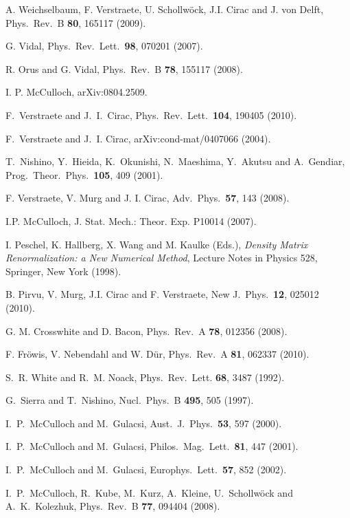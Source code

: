 A. Weichselbaum, F. Verstraete, U. Schollw\"{o}ck, J.I. Cirac and J. von Delft, Phys.\ Rev.\ B {\bf 80}, 165117 (2009).

G. Vidal, Phys.\ Rev.\ Lett.\ {\bf 98}, 070201 (2007).

R. Orus and G. Vidal, Phys.\ Rev.\ B {\bf 78}, 155117 (2008).

I. P. McCulloch, arXiv:0804.2509.

F.~Verstraete and J.~I.~Cirac, Phys.\ Rev.\ Lett.\ {\bf 104}, 190405 (2010).

F.~Verstraete and J.~I. Cirac, arXiv:cond-mat/0407066 (2004).

T.~Nishino, Y.~Hieida, K.~Okunishi, N.~Maeshima, Y.~Akutsu and A.~Gendiar, Prog.\ Theor.\ Phys.\ {\bf 105}, 409 (2001).

F. Verstraete, V. Murg and J. I. Cirac, Adv.\ Phys.\ {\bf 57}, 143 (2008).

I.P. McCulloch, J. Stat. Mech.: Theor. Exp. P10014 (2007).

I. Peschel, K. Hallberg, X. Wang and M. Kaulke (Eds.), {\em Density Matrix
Renormalization: a New Numerical Method}, Lecture Notes in Physics 528, Springer, New York (1998).

B. Pirvu, V. Murg, J.I. Cirac and F. Verstraete, New J.\ Phys.\ {\bf 12}, 025012 (2010).

G. M. Crosswhite and D. Bacon, Phys.\ Rev.\ A {\bf 78}, 012356 (2008).

F. Fr\"{o}wis, V. Nebendahl and W. D\"{u}r, Phys.\ Rev.\ A {\bf 81}, 062337 (2010).

S.~R. White and R.~M. Noack, Phys.\ Rev.\ Lett. {\bf 68}, 3487 (1992).

 G.~Sierra and T.~Nishino, Nucl.\ Phys.\ B {\bf 495}, 505 (1997).

 I.~P.~McCulloch and M.~Gulacsi, Aust.\ J.\ Phys.\ {\bf 53}, 597 (2000).

 I.~P.~McCulloch and M.~Gulacsi, Philos.\ Mag.\ Lett.\ {\bf 81}, 447 (2001).

 I.~P.~McCulloch and M.~Gulacsi, Europhys.\ Lett.\ {\bf 57}, 852 (2002).

 I.~P.~McCulloch, R.~Kube, M.~Kurz, A.~Kleine, U.~Schollw\"{o}ck and A.~K.~Kolezhuk, Phys.\ Rev.\ B {\bf 77}, 094404 (2008).

